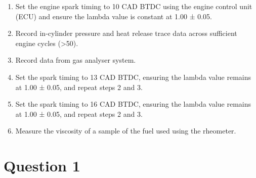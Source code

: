 \begin{enumerate}
    \item Set the engine spark timing to 10 CAD BTDC using the engine control unit (ECU) and ensure the lambda value is constant at 1.00 ± 0.05.
    \item Record in-cylinder pressure and heat release trace data across sufficient engine cycles (>50).
    \item Record data from gas analyser system.
    \item Set the spark timing to 13 CAD BTDC, ensuring the lambda value remains at 1.00 ± 0.05, and repeat steps 2 and 3.
    \item Set the spark timing to 16 CAD BTDC, ensuring the lambda value remains at 1.00 ± 0.05, and repeat steps 2 and 3.
    \item Measure the viscosity of a sample of the fuel used using the rheometer.
\end{enumerate}
\section{Question 1}
